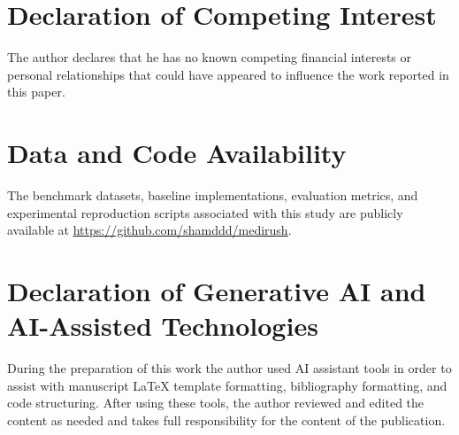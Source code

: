 \documentclass[preprint,12pt]{elsarticle}
\begin{document}
\section*{Declaration of Competing Interest}
The author declares that he has no known competing financial interests or personal relationships that could have appeared to influence the work reported in this paper.

\section*{Data and Code Availability}
The benchmark datasets, baseline implementations, evaluation metrics, and experimental reproduction scripts associated with this study are publicly available at \url{https://github.com/shamddd/medirush}.

\section*{Declaration of Generative AI and AI-Assisted Technologies}
During the preparation of this work the author used AI assistant tools in order to assist with manuscript LaTeX template formatting, bibliography formatting, and code structuring. After using these tools, the author reviewed and edited the content as needed and takes full responsibility for the content of the publication.



\end{document}
